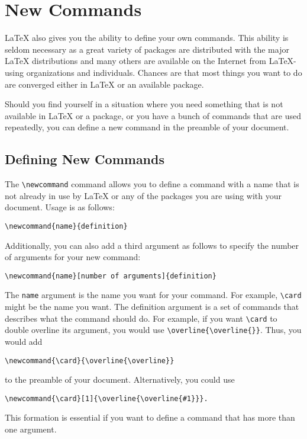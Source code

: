 \chapter{New Commands}
\label{cha:new-commands}

\LaTeX{} also gives you the ability to define your own commands.  This
ability is seldom necessary as a great variety of packages are
distributed with the major \LaTeX{} distributions and many others are
available on the Internet from \LaTeX{}-using organizations and
individuals.  Chances are that most things you want to do are
converged either in \LaTeX{} or an available package.

Should you find yourself in a situation where you need something that
is not available in \LaTeX{} or a package, or you have a bunch of
commands that are used repeatedly, you can define a new command in the
preamble of your document.

\section{Defining New Commands}
\label{sec:defin-new-comm}

The \verb|\newcommand| command allows you to define a command with a
name that is not already in use by \LaTeX{} or any of the packages you
are using with your document.  Usage is as follows:
\begin{verbatim}
\newcommand{name}{definition}
\end{verbatim}

Additionally, you can also add a third argument as follows to specify
the number of arguments for your new command:
\begin{verbatim}
\newcommand{name}[number of arguments]{definition}
\end{verbatim}

The \texttt{name} argument is the name you want for your command.  For
example, \verb|\card| might be the name you want.  The definition
argument is a set of commands that describes what the command should
do.  For example, if you want \verb|\card| to double overline its
argument, you would use \verb|\overline{\overline{}}|.  Thus, you
would add
\begin{verbatim}
\newcommand{\card}{\overline{\overline}}
\end{verbatim}
to the preamble of your document.  Alternatively, you could use
\begin{verbatim}
\newcommand{\card}[1]{\overline{\overline{#1}}}.
\end{verbatim}
This formation is essential if you want to define a command that has
more than one argument.

